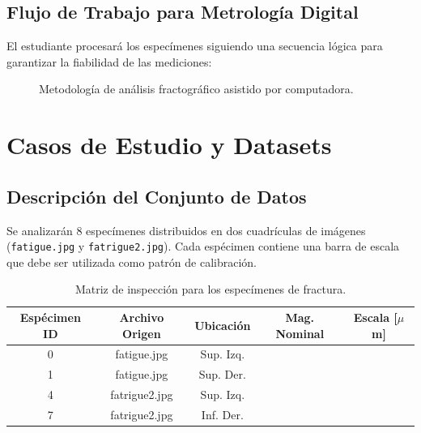 \documentclass[11pt, a4paper]{article}
\begin{document}
\subsection{Flujo de Trabajo para Metrología Digital}
El estudiante procesará los especímenes siguiendo una secuencia lógica para garantizar la fiabilidad de las mediciones:

\begin{figure}[htbp]
    \centering
    \caption{Metodología de análisis fractográfico asistido por computadora.}
\end{figure}

\section{Casos de Estudio y Datasets}

\subsection{Descripción del Conjunto de Datos}
Se analizarán 8 especímenes distribuidos en dos cuadrículas de imágenes (\texttt{fatigue.jpg} y \texttt{fatrigue2.jpg}). Cada espécimen contiene una barra de escala que debe ser utilizada como patrón de calibración.

\begin{table}[htbp]
    \centering
    \begin{tabular}{ccccc}
        \toprule
        Espécimen ID & Archivo Origen & Ubicación & Mag. Nominal & Escala [$\mu$m] \\
        \midrule
        0 & fatigue.jpg & Sup. Izq. &  &  \\
        1 & fatigue.jpg & Sup. Der. &  &  \\
        4 & fatrigue2.jpg & Sup. Izq. &  &  \\
        7 & fatrigue2.jpg & Inf. Der. &  &  \\
        \bottomrule
    \end{tabular}
    \caption{Matriz de inspección para los especímenes de fractura.}
\end{table}
\end{document}
